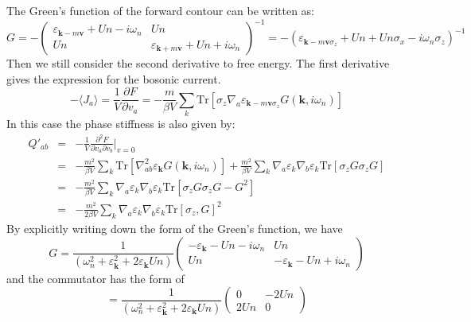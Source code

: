 \documentclass{article}
\newcommand{\nobracket}{}
\newcommand{\tmmathbf}[1]{\ensuremath{\boldsymbol{#1}}}
\begin{document}
The Green's function of the forward contour can be written as:
\begin{equation}
  G = - \left(\begin{array}{cc}
    \varepsilon_{\tmmathbf{k}- m\tmmathbf{v}} + U n - i \omega_n & U n\\
    U n & \varepsilon_{\tmmathbf{k}+ m\tmmathbf{v}} + U n + i \omega_n
  \end{array}\right)^{- 1} = - (\varepsilon_{\tmmathbf{k}- m\tmmathbf{v}
  \sigma_z} + U n + U n \sigma_x - i \omega_n \sigma_z)^{- 1}
\end{equation}
Then we still consider the second derivative to free energy. The first
derivative gives the expression for the bosonic current.
\begin{equation}
  - \langle J_a \rangle = \frac{1}{V} \frac{\partial F}{\partial v_a} = -
  \frac{m}{\beta V} \sum_k \text{Tr} [\sigma_z \nabla_a
  \varepsilon_{\tmmathbf{k}- m\tmmathbf{v} \sigma_z} G (\tmmathbf{k}, i
  \omega_n)]
\end{equation}
In this case the phase stiffness is also given by:
\begin{eqnarray}
  Q'_{a b} & = & - \frac{1}{V} \frac{\partial^2 F}{\partial v_a \partial v_b}
  |_{v = 0} \nobracket \nonumber\\
  & = & - \frac{m^2}{\beta V} \sum_k \text{Tr} [\nabla_{a b}^2
  \varepsilon_{\tmmathbf{k}} G (\tmmathbf{k}, i \omega_n)] + \frac{m^2}{\beta
  V} \sum_k \nabla_a \varepsilon_k \nabla_b \varepsilon_k \text{Tr} [\sigma_z
  G \sigma_z G] \\
  & = & - \frac{m^2}{\beta V} \sum_k \nabla_a \varepsilon_k \nabla_b
  \varepsilon_k \text{Tr} [\sigma_z G \sigma_z G - G^2] \nonumber\\
  & = & - \frac{m^2}{2 \beta V} \sum_k \nabla_a \varepsilon_k \nabla_b
  \varepsilon_k \text{Tr} [\sigma_z, G]^2 
\end{eqnarray}
By explicitly writing down the form of the Green's function, we have
\begin{equation}
  G = \frac{1}{(\omega_n^2 + \varepsilon_{\tmmathbf{k}}^2 + 2
  \varepsilon_{\tmmathbf{k}} U n)} \left(\begin{array}{cc}
    - \varepsilon_{\tmmathbf{k}} - U n - i \omega_n & U n\\
    U n & - \varepsilon_{\tmmathbf{k}} - U n + i \omega_n
  \end{array}\right)
\end{equation}
and the commutator has the form of
\begin{equation}
  [\sigma_z, G] = \frac{1}{(\omega_n^2 + \varepsilon_{\tmmathbf{k}}^2 + 2
  \varepsilon_{\tmmathbf{k}} U n)} \left(\begin{array}{cc}
    0 & - 2 U n\\
    2 U n & 0
  \end{array}\right)
\end{equation}
\end{document}
